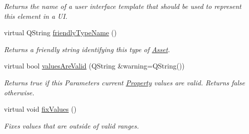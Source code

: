 \begin{DoxyCompactItemize}
\begin{DoxyCompactList}\small\item\em Returns the name of a user interface template that should be used to represent this element in a U\-I. \end{DoxyCompactList}\item 
virtual Q\-String \hyperlink{class_picto_1_1_double_parameter_aa501e011a63d3b44f45009ba9f8219f6}{friendly\-Type\-Name} ()
\begin{DoxyCompactList}\small\item\em Returns a friendly string identifying this type of \hyperlink{class_picto_1_1_asset}{Asset}. \end{DoxyCompactList}\item 
virtual bool \hyperlink{class_picto_1_1_double_parameter_a7b8c4548959c8d7d4b8951b9fa24c752}{values\-Are\-Valid} (Q\-String \&warning=Q\-String())
\begin{DoxyCompactList}\small\item\em Returns true if this Parameters current \hyperlink{class_picto_1_1_property}{Property} values are valid. Returns false otherwise. \end{DoxyCompactList}\item 
virtual void \hyperlink{class_picto_1_1_double_parameter_a4e3dea82bf5d16c1e9c556f716989022}{fix\-Values} ()
\begin{DoxyCompactList}\small\item\em Fixes values that are outside of valid ranges. \end{DoxyCompactList}\end{DoxyCompactItemize}
